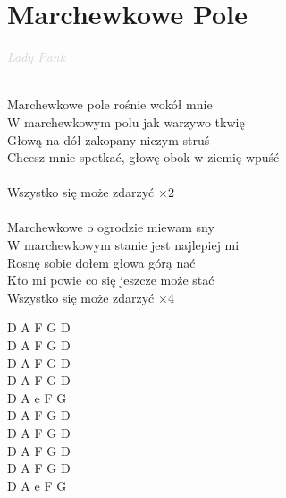 \documentclass[a5paper, 10pt]{book}
\begin{document}
\section{Marchewkowe Pole}\textcolor{lightgray}{\textit{Lady Pank}}\\~\\
\begin{minipage}[t]{0.7\textwidth}
Marchewkowe pole rośnie wokół mnie \\
W marchewkowym polu jak warzywo tkwię \\
Głową na dół zakopany niczym struś \\
Chcesz mnie spotkać, głowę obok w ziemię wpuść \\
\\
\hspace*{5mm}Wszystko się może zdarzyć \hspace*{10mm} $\times$2\\
\\
Marchewkowe o ogrodzie miewam sny \\
W marchewkowym stanie jest najlepiej mi \\
Rosnę sobie dołem głowa górą nać \\
Kto mi powie co się jeszcze może stać\\

\hspace*{5mm}Wszystko się może zdarzyć \hspace*{10mm} $\times$4\\
\end{minipage}
\begin{minipage}[t]{0.3\textwidth}
D A F G D\\
D A F G D\\
D A F G D\\
D A F G D\\

D A e F G\\

D A F G D\\
D A F G D\\
D A F G D\\
D A F G D\\

D A e F G\\
\end{minipage}

\newpage
\end{document}
